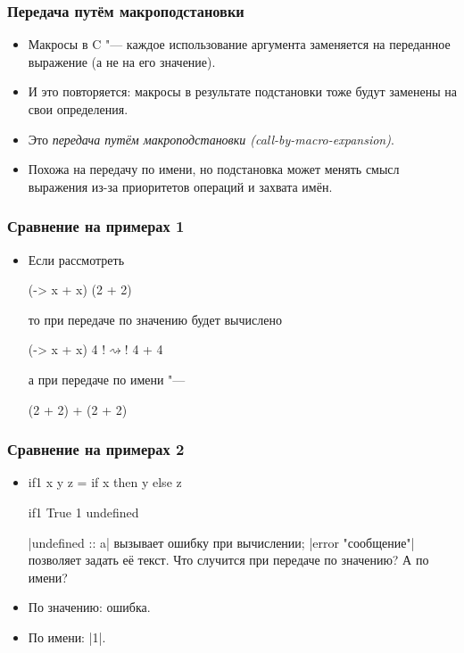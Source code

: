 \documentclass[11pt]{beamer}
\begin{document}
\begin{frame}[fragile]
  \frametitle{Передача путём макроподстановки}
  \begin{itemize}
    \item Макросы в C "--- каждое использование аргумента заменяется на переданное выражение (а не на его значение).
    \item И это повторяется: макросы в результате подстановки тоже будут заменены на свои определения.
    \item Это \emph{передача путём макроподстановки (call-by-macro-expansion)}.
          \pause
    \item Похожа на передачу по имени, но подстановка может менять смысл выражения из-за приоритетов операций и захвата имён.
  \end{itemize}
\end{frame}

\begin{frame}[fragile]
  \frametitle{Сравнение на примерах 1}
  \begin{itemize}
    \item Если рассмотреть
          \begin{haskell}
            (\x -> x + x) (2 + 2)
          \end{haskell}
          то при передаче по значению будет вычислено \pause
          \begin{haskell}
            (\x -> x + x) 4  !$\rightsquigarrow$!  4 + 4
          \end{haskell}
          а при передаче по имени "--- \pause
          \begin{haskell}
            (2 + 2) + (2 + 2)
          \end{haskell}
  \end{itemize}
\end{frame}

\begin{frame}[fragile]
  \frametitle{Сравнение на примерах 2}
  \begin{itemize}
    \item
          \begin{haskell}
            if1 x y z = if x then y else z

            if1 True 1 undefined
          \end{haskell}
          \haskinline|undefined :: a| вызывает ошибку при вычислении; \haskinline|error "сообщение"| позволяет задать её текст.
          \pause
          Что случится при передаче по значению? А по имени?
          \pause
    \item По значению: ошибка.
          \pause
    \item По имени: \haskinline|1|.
  \end{itemize}
\end{frame}
\end{document}
